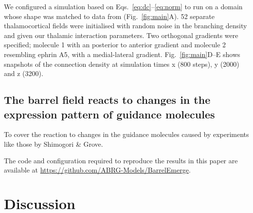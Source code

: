\documentclass[9pt,twocolumn,twoside,lineno]{pnas-new}
\begin{document}
We configured a simulation based on Eqs.~\ref{eq:dc}--\ref{eq:norm} to run on
a domain whose shape was matched to data from \cite{shimogori_fibroblast_2005}
(Fig.~\ref{fig:main}A). 52 separate thalamocortical fields were initialised
with random noise in the branching density and given our thalamic interaction
parameters. Two orthogonal gradients were specified; molecule 1 with an
posterior to anterior gradient and molecule 2 resembling ephrin A5, with a
medial-lateral gradient. Fig.~\ref{fig:main}D--E shows snapshots of the
connection density at simulation times x (800 steps), y (2000) and z (3200).

%

\subsection*{The barrel field reacts to changes in the expression pattern of guidance molecules}

To cover the reaction to changes in the guidance molecules caused by
experiments like those by Shimogori \& Grove.

The code and configuration required to reproduce the results in this paper are
available at \url{https://github.com/ABRG-Models/BarrelEmerge}.

\section*{Discussion}
\end{document}

